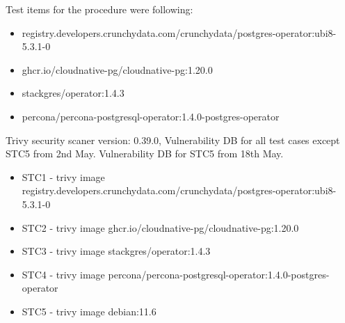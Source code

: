 Test items for the procedure were following:
\begin{itemize}
    \item registry.developers.crunchydata.com/crunchydata/postgres-operator:ubi8-5.3.1-0
    \item ghcr.io/cloudnative-pg/cloudnative-pg:1.20.0
    \item stackgres/operator:1.4.3
    \item percona/percona-postgresql-operator:1.4.0-postgres-operator
\end{itemize}

Trivy security scaner version: 0.39.0, Vulnerability DB for all test cases except STC5 from 2nd May. Vulnerability DB for STC5 from 18th May.

\begin{itemize}
    \item STC1 - trivy image registry.developers.crunchydata.com/crunchydata/postgres-operator:ubi8-5.3.1-0
    \item STC2 - trivy image ghcr.io/cloudnative-pg/cloudnative-pg:1.20.0
    \item STC3 - trivy image stackgres/operator:1.4.3
    \item STC4 - trivy image percona/percona-postgresql-operator:1.4.0-postgres-operator
    \item STC5 - trivy image debian:11.6
\end{itemize}

